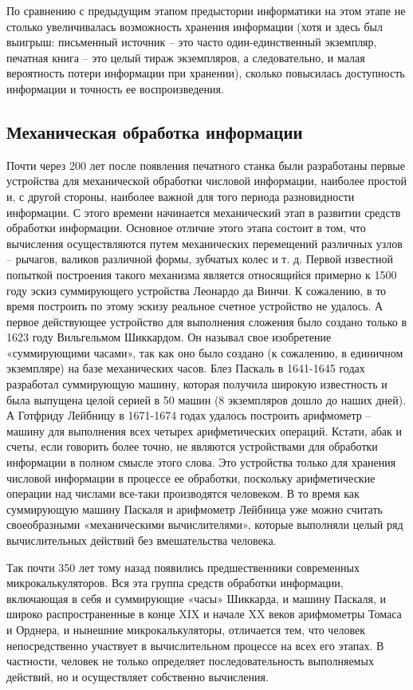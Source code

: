 По сравнению с предыдущим этапом предыстории информатики на этом этапе не столько увеличивалась возможность хранения информации (хотя и здесь был выигрыш: письменный источник – это часто один-единственный экземпляр, печатная книга – это целый тираж экземпляров, а следовательно, и малая вероятность потери информации при хранении), сколько повысилась доступность информации и точность ее воспроизведения.  \cite{bib104}

\subsection{Механическая обработка информации} \label{subsect1_1_4}


Почти через 200 лет после появления печатного станка были разработаны первые устройства для механической обработки числовой информации, наиболее простой и, с другой стороны, наиболее важной для того периода разновидности информации. С этого времени начинается механический этап в развитии средств обработки информации. Основное отличие этого этапа состоит в том, что вычисления осуществляются путем механических перемещений различных узлов – рычагов, валиков различной формы, зубчатых колес и т. д.
Первой известной попыткой построения такого механизма является относящийся примерно к 1500 году эскиз суммирующего устройства Леонардо да Винчи. К сожалению, в то время построить по этому эскизу реальное счетное устройство не удалось. А первое действующее устройство для выполнения сложения было создано только в 1623 году Вильгельмом Шиккардом. Он называл свое изобретение «суммирующими часами», так как оно было создано (к сожалению, в единичном экземпляре) на базе механических часов. Блез Паскаль в 1641-1645 годах разработал суммирующую машину, которая получила широкую известность и была выпущена целой серией в 50 машин (8 экземпляров дошло до наших дней). А Готфриду Лейбницу в 1671-1674 годах удалось построить арифмометр – машину для выполнения всех четырех арифметических операций.
Кстати, абак и счеты, если говорить более точно, не являются устройствами для обработки информации в полном смысле этого слова. Это устройства только для хранения числовой информации в процессе ее обработки, поскольку арифметические операции над числами все-таки производятся человеком. В то время как суммирующую машину Паскаля и арифмометр Лейбница уже можно считать своеобразными «механическими вычислителями», которые выполняли целый ряд вычислительных действий без вмешательства человека.

Так почти 350 лет тому назад появились предшественники современных микрокалькуляторов. Вся эта группа средств обработки информации, включающая в себя и суммирующие «часы» Шиккарда, и машину Паскаля, и широко распространенные в конце XIX и начале XX веков арифмометры Томаса и Орднера, и нынешние микрокалькуляторы, отличается тем, что человек непосредственно участвует в вычислительном процессе на всех его этапах. В частности, человек не только определяет последовательность выполняемых действий, но и осуществляет собственно вычисления.

